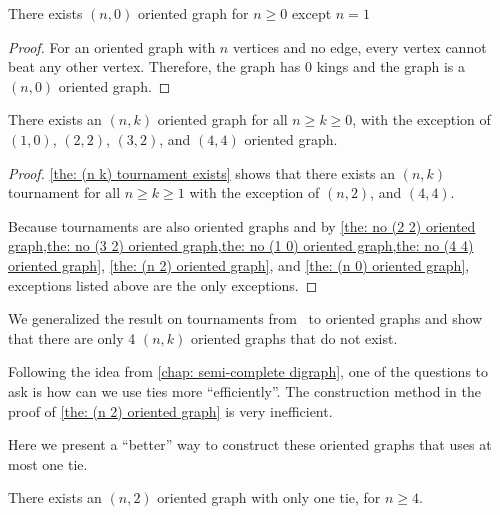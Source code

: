 \begin{lemma}\label{the: (n 0) oriented graph}
  There exists \((n, 0)\) oriented graph for \(n \geq 0\)
  except \(n = 1\)
\end{lemma}

\begin{proof}
  For an oriented graph with \(n\) vertices and no edge,
  every vertex cannot beat any other vertex.
  Therefore, the graph has 0 kings
  and the graph is a \((n, 0)\) oriented graph.
\end{proof}

\begin{theorem}\label{the: (n k) oriented graph}
  There exists an \((n, k)\) oriented graph for all \(n \geq k \geq 0\),
  with the exception of \((1, 0)\), \((2, 2)\), \((3, 2)\),
  and \((4, 4)\) oriented graph.
\end{theorem}

\begin{proof}
  \cref{the: (n k) tournament exists} shows that
  there exists an \((n, k)\) tournament for all \(n \geq k \geq 1\)
  with the exception of \((n, 2)\), and \((4, 4)\).

  Because tournaments are also oriented graphs and
  by \cref{the: no (2 2) oriented graph,the: no (3 2) oriented graph,the: no (1 0) oriented graph,the: no (4 4) oriented graph}, \cref{the: (n 2) oriented graph}, and \cref{the: (n 0) oriented graph},
  exceptions listed above are the only exceptions.
\end{proof}

We generalized the result on tournaments from~\cite{maurer_king_1980}
to oriented graphs and show that there are only 4
\((n, k)\) oriented graphs that do not exist.

Following the idea from \cref{chap: semi-complete digraph},
one of the questions to ask is how can we use
ties more ``efficiently''.
The construction method in the proof of
\cref{the: (n 2) oriented graph} is very inefficient.

Here we present a ``better'' way to construct
these oriented graphs that uses at most one tie.

\begin{lemma}\label{the: (n 2) with one tie}
  There exists an \((n, 2)\) oriented graph
  with only one tie, for \(n \geq 4\).
\end{lemma}

